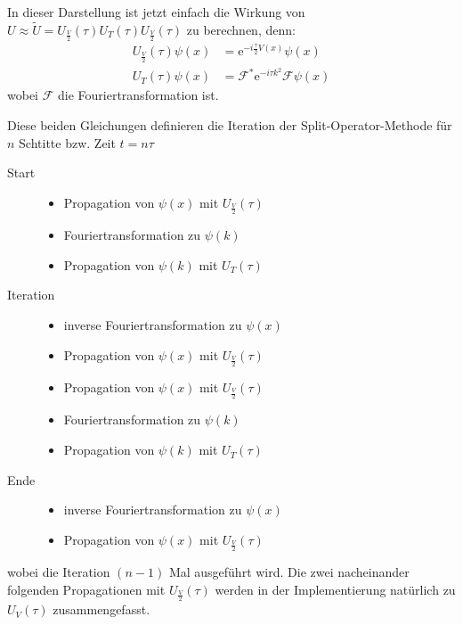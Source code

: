 \documentclass[10pt,a4paper,german]{scrartcl}
\begin{document}
		In dieser Darstellung ist jetzt einfach die Wirkung von
		$U \approx \tilde{U}=U_{\frac{V}{2}}(\tau) U_T(\tau) U_{\frac{V}{2}}(\tau)$
		zu berechnen,	denn:
		\begin{align}
		\label{it:hV}
			U_{\frac{V}{2}}(\tau) \psi(x) &= \mathrm{e}^{-i \frac{\tau}{2} V(x)} \psi(x)\\
		\label{it:T}
			U_T(\tau) \psi(x) &= \mathcal{F}^{*} \mathrm{e}^{-i \tau k^2} \mathcal{F} \psi(x)
		\end{align}
		wobei $\mathcal{F}$ die Fouriertransformation ist.

		Diese beiden Gleichungen definieren die Iteration der Split-Operator-Methode
		für $n$ Schtitte bzw. Zeit $t=n \tau$

		\begin{description}
			\item[Start]
				\begin{itemize}
					\item Propagation von $\psi(x)$ mit $U_{\frac{V}{2}}(\tau)$
					\item Fouriertransformation zu $\psi(k)$
					\item Propagation von $\psi(k)$ mit $U_T(\tau)$
				\end{itemize}
			\item[Iteration]
				\begin{itemize}
					\item inverse Fouriertransformation zu $\psi(x)$
					\item Propagation von $\psi(x)$ mit $U_{\frac{V}{2}}(\tau)$
					\item Propagation von $\psi(x)$ mit $U_{\frac{V}{2}}(\tau)$
					\item Fouriertransformation zu $\psi(k)$
					\item Propagation von $\psi(k)$ mit $U_T(\tau)$
				\end{itemize}
			\item[Ende]
				\begin{itemize}
					\item inverse Fouriertransformation zu $\psi(x)$
					\item Propagation von $\psi(x)$ mit $U_{\frac{V}{2}}(\tau)$
				\end{itemize}
		\end{description}
		wobei die Iteration $(n-1)$ Mal ausgeführt wird. Die zwei nacheinander folgenden
		Propagationen mit $U_{\frac{V}{2}}(\tau)$ werden in der Implementierung natürlich
		zu $U_V(\tau)$ zusammengefasst.
\end{document}
